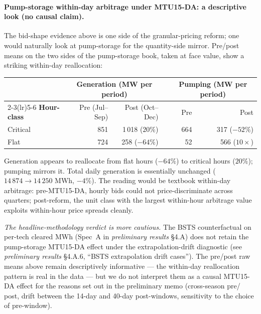 \documentclass[11pt,a4paper]{article}
\begin{document}
\paragraph{Pump-storage within-day arbitrage under MTU15-DA: a descriptive look (no causal claim).} The bid-shape evidence above is one side of the granular-pricing reform; one would naturally look at pump-storage for the quantity-side mirror. Pre/post means on the two sides of the pump-storage book, taken at face value, show a striking within-day reallocation:

\begin{center}
\footnotesize
\setlength{\tabcolsep}{8pt}
\begin{tabular}{l r r c r r}
\toprule
& \multicolumn{2}{c}{\textbf{Generation (MW per period)}} & & \multicolumn{2}{c}{\textbf{Pumping (MW per period)}} \\
\cmidrule(lr){2-3}\cmidrule(lr){5-6}
\textbf{Hour-class} & Pre (Jul--Sep) & Post (Oct--Dec) & & Pre & Post \\
\midrule
Critical & 851 & 1\,018 ($20\%$) & & 664 & 317 ($-52\%$) \\
Flat     & 724 & 258 ($-64\%$)    & &  52 & 566 ($10\times$) \\
\bottomrule
\end{tabular}
\end{center}

\noindent Generation appears to reallocate from flat hours
($-64\%$) to critical hours ($20\%$); pumping mirrors it. Total
daily generation is essentially unchanged ($14\,874 \to 14\,250$
MWh, $-4\%$). The reading would be textbook within-day arbitrage:
pre-MTU15-DA, hourly bids could not price-discriminate across
quarters; post-reform, the unit class with the largest within-hour
arbitrage value exploits within-hour price spreads cleanly.

\emph{The headline-methodology verdict is more cautious.} The BSTS
counterfactual on per-tech cleared MWh (Spec~A in
\emph{preliminary results} \S 4.A) does not retain the pump-storage
MTU15-DA effect under the extrapolation-drift diagnostic (see
\emph{preliminary results} \S 4.A.6, ``BSTS extrapolation drift
cases''). The pre/post raw means above remain descriptively
informative --- the within-day reallocation pattern is real in the
data --- but we do not interpret them as a causal MTU15-DA effect
for the reasons set out in the preliminary memo (cross-season pre/
post, drift between the 14-day and 40-day post-windows, sensitivity
to the choice of pre-window).
\end{document}
